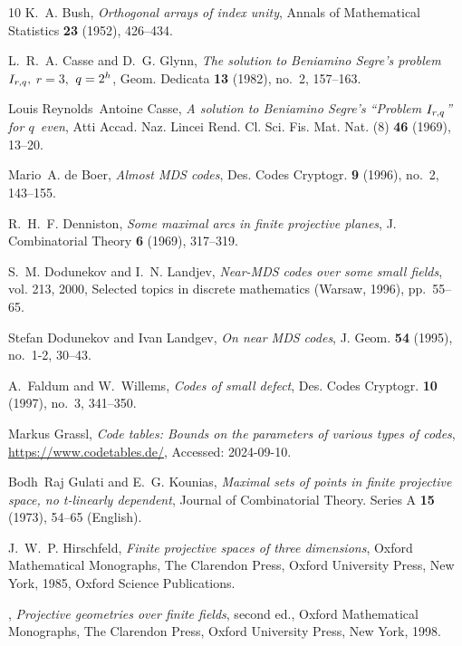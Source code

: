 \documentclass[11pt,a4paper]{amsart}
\theoremstyle{plain}
\theoremstyle{definition}
\theoremstyle{remark}
\begin{document}
\begin{thebibliography}{10}
		K.~A. Bush, \emph{Orthogonal arrays of index unity}, Annals of Mathematical
		Statistics \textbf{23} (1952), 426--434. 

		L.~R.~A. Casse and D.~G. Glynn, \emph{The solution to {B}eniamino {S}egre's
			problem {$I\sb{r,q},$} {$r=3,$} {$q=2\sp{h}$}}, Geom. Dedicata \textbf{13}
		(1982), no.~2, 157--163. 

		Louis Reynolds~Antoine Casse, \emph{A solution to {B}eniamino {S}egre's
			``{P}roblem {$I\sb{r,q}$}'' for {$q$}\ even}, Atti Accad. Naz. Lincei Rend.
		Cl. Sci. Fis. Mat. Nat. (8) \textbf{46} (1969), 13--20. 

		Mario~A. de{ }Boer, \emph{Almost {MDS} codes}, Des. Codes Cryptogr. \textbf{9}
		(1996), no.~2, 143--155. 

		R.~H.~F. Denniston, \emph{Some maximal arcs in finite projective planes}, J.
		Combinatorial Theory \textbf{6} (1969), 317--319. 

		S.~M. Dodunekov and I.~N. Landjev, \emph{Near-{MDS} codes over some small
			fields}, vol. 213, 2000, Selected topics in discrete mathematics (Warsaw,
		1996), pp.~55--65. 

		Stefan Dodunekov and Ivan Landgev, \emph{On near {MDS} codes}, J. Geom.
		\textbf{54} (1995), no.~1-2, 30--43. 

		A.~Faldum and W.~Willems, \emph{Codes of small defect}, Des. Codes Cryptogr.
		\textbf{10} (1997), no.~3, 341--350. 

		Markus Grassl, \emph{Code tables: Bounds on the parameters of various types of
			codes}, {\url{https://www.codetables.de/}}, Accessed: 2024-09-10.

		Bodh~Raj Gulati and E.~G. Kounias, \emph{Maximal sets of points in finite
			projective space, no t-linearly dependent}, Journal of Combinatorial Theory.
		Series A \textbf{15} (1973), 54--65 (English).

		J.~W.~P. Hirschfeld, \emph{Finite projective spaces of three dimensions},
		Oxford Mathematical Monographs, The Clarendon Press, Oxford University Press,
		New York, 1985, Oxford Science Publications. 

		\bysame, \emph{Projective geometries over finite fields}, second ed., Oxford
		Mathematical Monographs, The Clarendon Press, Oxford University Press, New
		York, 1998. 


\end{thebibliography}
\end{document}
